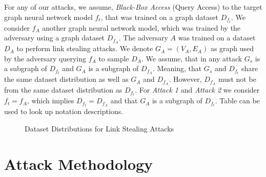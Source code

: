     For any of our attacks, we assume, \emph{Black-Box Access} (Query Access) to the target graph neural network model $f_t$, that was trained on a graph dataset $D_{f_t}$.
    We consider $f_A$ another graph neural network model, which was trained by the adversary using a graph dataset $D_{f_A}$.
    The adversary $A$ was trained on a dataset $D_A$ to perform link stealing attacks.
    We denote $G_A = (V_A, E_A)$ as graph used by the adversary querying $f_A$ to sample $D_A$.
    We assume, that in any attack $G_s$ is a subgraph of $D_{f_t}$ and $G_A$ is a subgraph of $D_{f_A}$.
    Meaning, that $G_s$ and $D_{f_t}$ share the same dataset distribution as well as $G_A$ and $D_{f_A}$.
    However, $D_{f_A}$ must not be from the same dataset distribution as $D_{f_t}$.
    For \emph{Attack 1} and \emph{Attack 2} we consider $f_t = f_A$, which implies $D_{f_t} = D_{f_A}$ and that $G_A$ is a subgraph of $D_{f_t}$. 
    Table  can be used to look up notation descriptions.

    \begin{figure}[h!]
      \caption{Dataset Distributions for Link Stealing Attacks}
      \label{figure:dataset-distribution}
    \end{figure}

    

  \section{Attack Methodology}

